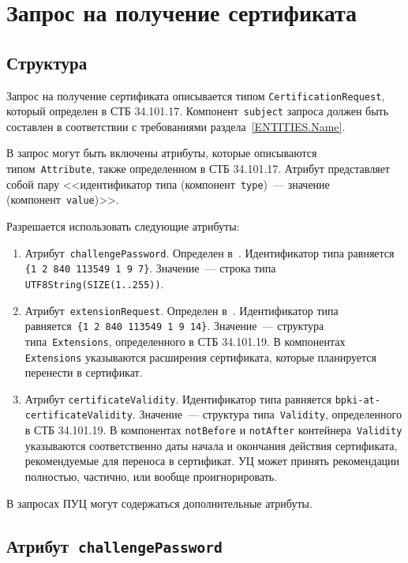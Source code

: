 \section{Запрос на получение сертификата}\label{FMT.CSR}

\subsection{Структура}\label{FMT.CSR.Structure}

Запрос на получение сертификата описывается типом 
\texttt{CertificationRequest}, который определен в СТБ 34.101.17. 
%
Компонент~\texttt{subject} запроса должен быть составлен в соответствии
с требованиями раздела~\ref{ENTITIES.Name}.

В запрос могут быть включены атрибуты, которые описываются 
типом~\texttt{Attribute}, также определенном в СТБ 34.101.17. 
Атрибут представляет собой пару <<идентификатор типа 
(компонент~\texttt{type})~--- значение (компонент~\texttt{value})>>.

Разрешается использовать следующие атрибуты:
\begin{enumerate}
\item
Атрибут~\texttt{challengePassword}. Определен в~\cite{PKCS9}.
%
Идентификатор типа равняется \verb|{1 2 840 113549 1 9 7}|.
Значение~--- строка типа \verb|UTF8String(SIZE(1..255))|.

\item
Атрибут~\texttt{extensionRequest}. Определен в~\cite{PKCS9}.
%
Идентификатор типа равняется~\verb|{1 2 840 113549 1 9 14}|.
Значение~--- структура типа~\verb|Extensions|, определенного в СТБ 34.101.19.
В компонентах \verb|Extensions| указываются расширения сертификата,
которые планируется перенести в сертификат.

\item
Атрибут \texttt{certificateValidity}.
Идентификатор типа равняется \verb|bpki-at-certificateValidity|.
Значение~--- структура типа~\verb|Validity|, определенного в СТБ 34.101.19.
%
В компонентах \texttt{notBefore} и \texttt{notAfter} контейнера~\verb|Validity| 
указываются соответственно даты начала и окончания действия сертификата,
рекомендуемые для переноса в сертификат.
%
УЦ может принять рекомендации полностью, частично, или вообще проигнорировать. 
\end{enumerate}

В запросах ПУЦ могут содержаться дополнительные атрибуты.

\subsection{Атрибут~\texttt{challengePassword}}\label{FMT.CSR.CP}

